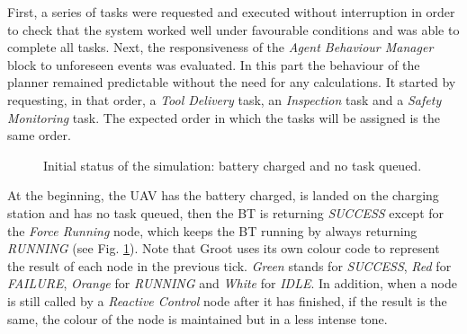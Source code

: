 First, a series of tasks were requested and executed without interruption in order to check that the system worked well under favourable conditions and was able to complete all tasks. Next, the responsiveness of the \emph{Agent Behaviour Manager} block to unforeseen events was evaluated. In this part the behaviour of the planner remained predictable without the need for any calculations. It started by requesting, in that order, a \emph{Tool Delivery} task, an \emph{Inspection} task and a \emph{Safety Monitoring} task. The expected order in which the tasks will be assigned is the same order.

\begin{figure}[htbp]
    \centering
    \hfill
    \caption{Initial status of the simulation: battery charged and no task queued.}
    \label{fig:BTinitialization}
\end{figure}

At the beginning, the \gls{UAV} has the battery charged, is landed on the charging station and has no task queued, then the \gls{BT} is returning \emph{SUCCESS} except for the \emph{Force Running} node, which keeps the \gls{BT} running by always returning \emph{RUNNING} (see Fig. \ref{fig:BTinitialization}). Note that Groot uses its own colour code to represent the result of each node in the previous tick. \emph{Green} stands for \emph{SUCCESS}, \emph{Red} for \emph{FAILURE}, \emph{Orange} for \emph{RUNNING} and \emph{White} for \emph{IDLE}. In addition, when a node is still called by a \emph{Reactive Control} node after it has finished, if the result is the same, the colour of the node is maintained but in a less intense tone. 

